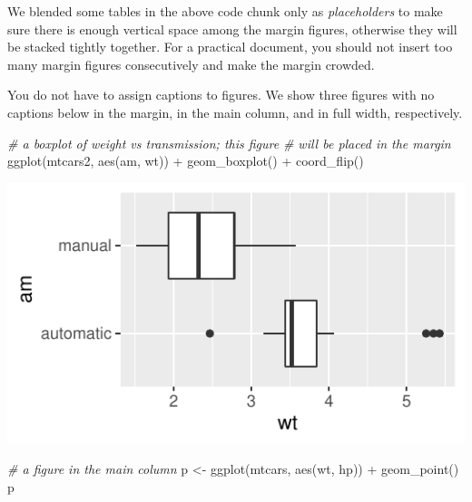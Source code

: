 \documentclass[]{tufte-handout}
\newenvironment{Shaded}{}{}
\newcommand{\CommentTok}[1]{\textcolor[rgb]{0.38,0.63,0.69}{\textit{#1}}}
\newcommand{\FunctionTok}[1]{\textcolor[rgb]{0.02,0.16,0.49}{#1}}
\newcommand{\NormalTok}[1]{#1}
\newcommand{\OtherTok}[1]{\textcolor[rgb]{0.00,0.44,0.13}{#1}}
\newcommand{\SpecialCharTok}[1]{\textcolor[rgb]{0.25,0.44,0.63}{#1}}
\begin{document}
We blended some tables in the above code chunk only as
\emph{placeholders} to make sure there is enough vertical space among
the margin figures, otherwise they will be stacked tightly together. For
a practical document, you should not insert too many margin figures
consecutively and make the margin crowded.

You do not have to assign captions to figures. We show three figures
with no captions below in the margin, in the main column, and in full
width, respectively.

\begin{Shaded}
\begin{Highlighting}[]
\CommentTok{\# a boxplot of weight vs transmission; this figure}
\CommentTok{\# will be placed in the margin}
\FunctionTok{ggplot}\NormalTok{(mtcars2, }\FunctionTok{aes}\NormalTok{(am, wt)) }\SpecialCharTok{+} \FunctionTok{geom\_boxplot}\NormalTok{() }\SpecialCharTok{+}
  \FunctionTok{coord\_flip}\NormalTok{()}
\end{Highlighting}
\end{Shaded}

\begin{marginfigure}
\includegraphics{tufte_files/figure-latex/fig-nocap-margin-1} \end{marginfigure}

\begin{Shaded}
\begin{Highlighting}[]
\CommentTok{\# a figure in the main column}
\NormalTok{p }\OtherTok{\textless{}{-}} \FunctionTok{ggplot}\NormalTok{(mtcars, }\FunctionTok{aes}\NormalTok{(wt, hp)) }\SpecialCharTok{+} \FunctionTok{geom\_point}\NormalTok{()}
\NormalTok{p}
\end{Highlighting}
\end{Shaded}
\end{document}
